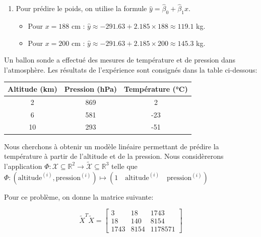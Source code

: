 \documentclass[solutions]{../exercices}
\begin{document}
\begin{solution}
\begin{enumerate}
        \item Pour prédire le poids, on utilise la formule $\hat{y} = \hat{\beta}_0 + \hat{\beta}_1 x$.
        \begin{itemize}
            \item Pour $x = 188$ cm : $\hat{y} \approx -291.63 + 2.185 \times 188 \approx 119.1$ kg.
            \item Pour $x = 200$ cm : $\hat{y} \approx -291.63 + 2.185 \times 200 \approx 145.3$ kg.
        \end{itemize}
    \end{enumerate}
\end{solution}

\begin{exercice}
Un ballon sonde a effectué des mesures de température et de pression dans l'atmosphère. Les résultats de l'expérience sont consignés dans la table ci-dessous:

\begin{center}
	\begin{tabular}{|c|c|c|}
		\hline
		\textbf{Altitude} (km) & \textbf{Pression} (hPa) & \textbf{Température} (°C) \\ \hline
		2 & 869 & 2 \\
		6 & 581 & -23 \\
		10 & 293 & -51 \\
		\hline
	\end{tabular}
\end{center}

Nous cherchons à obtenir un modèle linéaire permettant de prédire la température à partir de l'altitude et de la pression. Nous considèrerons l'application $\Phi: \mathcal{X} \subseteq \mathbb{R}^2 \to \tilde{\mathcal{X}} \subseteq \mathbb{R}^3$ telle que $\Phi: \left(\text{altitude}^{(i)}, \text{pression}^{(i)}\right) \mapsto \left(1 \quad \text{altitude}^{(i)} \quad \text{pression}^{(i)}\right)$

Pour ce problème, on donne la matrice suivante:

\begin{equation}
	\tilde{X}^T \tilde{X} = \begin{bmatrix}3 & 18 & 1743 \\ 18 & 140 & 8154 \\ 1743 & 8154 & 1178571 \end{bmatrix}
	\nonumber
\end{equation}



\end{exercice}
\end{document}
